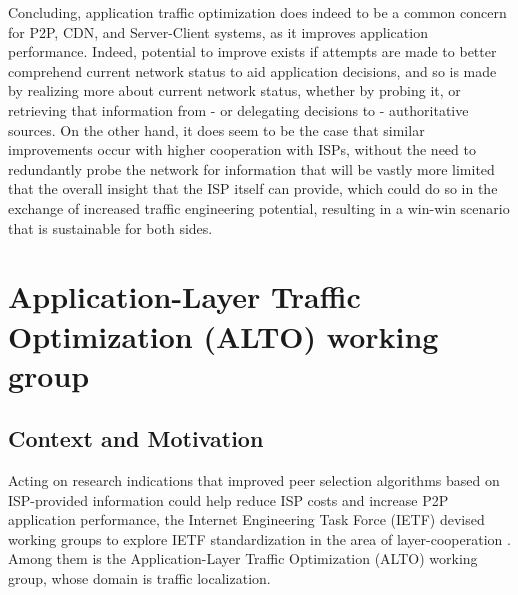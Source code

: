         Concluding, application traffic optimization does indeed to be a common concern for P2P, CDN, and Server-Client systems, as it improves application performance.
        Indeed, potential to improve exists if attempts are made to better comprehend current network status to aid application decisions, and so is made by realizing more about current network status, whether by probing it, or retrieving that information from - or delegating decisions to - authoritative sources.
        On the other hand, it does seem to be the case that similar improvements occur with higher cooperation with ISPs, without the need to redundantly probe the network for information that will be vastly more limited that the overall insight that the ISP itself can provide, which could do so in the exchange of increased traffic engineering potential, resulting in a win-win scenario that is sustainable for both sides.

    \section{Application-Layer Traffic Optimization (ALTO) working group}

    \subsection{Context and Motivation}

        Acting on research indications that improved peer selection algorithms based on ISP-provided information could help reduce ISP costs and increase P2P application performance, the Internet Engineering Task Force (IETF) devised working groups to explore IETF standardization in the area of layer-cooperation \cite{seedorf2009}.
        Among them is the Application-Layer Traffic Optimization (ALTO) working group, whose domain is traffic localization.



